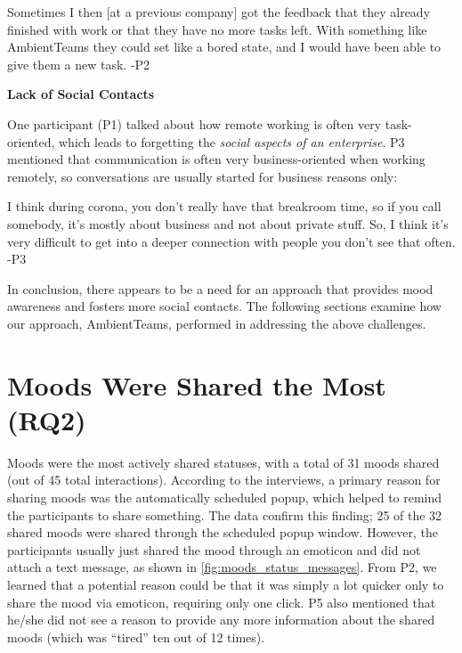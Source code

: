 \begin{displayquote}
    Sometimes I then [at a previous company] got the feedback that they already finished with work or that they have no more tasks left. With something like AmbientTeams they could set like a bored state, and I would have been able to give them a new task. -P2
\end{displayquote}

\bigskip\noindent\textbf{Lack of Social Contacts}

\medskip\noindent One participant (P1) talked about how remote working is often very task-oriented, which leads to forgetting the \textit{social aspects of an enterprise}. P3 mentioned that communication is often very business-oriented when working remotely, so conversations are usually started for business reasons only:

\begin{displayquote}
    I think during corona, you don't really have that breakroom time, so if you call somebody, it's mostly about business and not about private stuff. So, I think it's very difficult to get into a deeper connection with people you don't see that often. -P3
\end{displayquote}

In conclusion, there appears to be a need for an approach that provides mood awareness and fosters more social contacts. The following sections examine how our approach, AmbientTeams, performed in addressing the above challenges.

\section{Moods Were Shared the Most (RQ2)}
\label{section:moods_were_shared_the_most}
Moods were the most actively shared statuses, with a total of 31 moods shared (out of 45 total interactions). According to the interviews, a primary reason for sharing moods was the automatically scheduled popup, which helped to remind the participants to share something. The data confirm this finding; 25 of the 32 shared moods were shared through the scheduled popup window. However, the participants usually just shared the mood through an emoticon and did not attach a text message, as shown in \autoref{fig:moods_status_messages}. From P2, we learned that a potential reason could be that it was simply a lot quicker only to share the mood via emoticon, requiring only one click. P5 also mentioned that he/she did not see a reason to provide any more information about the shared moods (which was \enquote{tired} ten out of 12 times).

